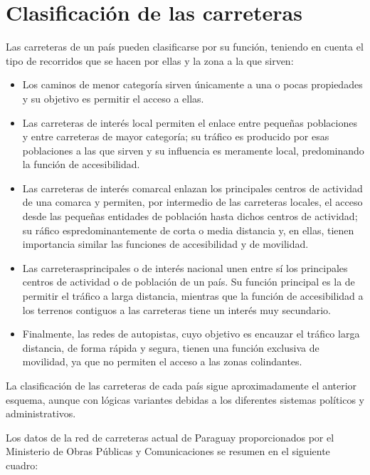 \documentclass[letterpaper,10pt,english]{sphinxmanual}
\begin{document}
\section{Clasificación de las carreteras}
\label{\detokenize{intro:clasificacion-de-las-carreteras}}
Las carreteras de un país pueden clasificarse por su función, teniendo en cuenta el tipo de recorridos que se hacen por ellas y la zona a la que sirven:
\begin{itemize}
\item {} 
Los caminos de menor categoría sirven únicamente a una o pocas propiedades y su objetivo es permitir el acceso a ellas.

\item {} 
Las carreteras de interés local permiten el enlace entre pequeñas poblaciones y entre carreteras de mayor categoría; su tráfico es producido por esas poblaciones a las que sirven y su influencia es meramente local, predominando la función de accesibilidad.

\item {} 
Las carreteras de interés comarcal enlazan los principales centros de actividad de una comarca y permiten, por intermedio de las carreteras locales, el acceso desde las pequeñas entidades de población hasta dichos centros de actividad; su ráfico espredominantemente de corta o media distancia y, en ellas, tienen importancia similar las funciones de accesibilidad y de movilidad.

\item {} 
Las carreterasprincipales o de interés nacional unen entre sí los principales centros de actividad o de población de un país. Su función principal es la de permitir el tráfico a larga distancia,  mientras que la función de accesibilidad a los terrenos contiguos a las carreteras tiene un interés muy secundario.

\item {} 
Finalmente, las redes de autopistas, cuyo objetivo es encauzar el tráfico larga distancia, de forma rápida y segura, tienen una función exclusiva de movilidad, ya que no permiten el acceso a las zonas colindantes.

\end{itemize}

La clasificación de las carreteras de cada país sigue aproximadamente el anterior esquema, aunque con lógicas variantes debidas a los diferentes sistemas políticos y administrativos.

Los datos de la red de carreteras actual de Paraguay proporcionados por el Ministerio de Obras Públicas y Comunicaciones se resumen en el siguiente cuadro:
\end{document}

